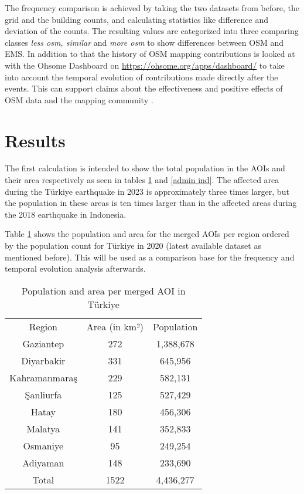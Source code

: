 \documentclass[oneside,twocolumn,10pt,cleanfoot,cleanhead]{asme2ej}
\begin{document}
The frequency comparison is achieved by taking the two datasets from before, the grid and the building counts, and calculating statistics like difference and deviation of the counts.
The resulting values are categorized into three comparing classes \textit{less osm, similar} and \textit{more osm} to show differences between OSM and EMS.
In addition to that the history of OSM mapping contributions is looked at with the Ohsome Dashboard on \url{https://ohsome.org/apps/dashboard/} to take into account the temporal evolution of contributions made directly after the events.
This can support claims about the effectiveness and positive effects of OSM data and the mapping community \cite{BarronEA2014}.


\section{Results}

The first calculation is intended to show the total population in the AOIs and their area respectively as seen in tables \ref{admin tur} and \ref{admin ind}.
The affected area during the Türkiye earthquake in 2023 is approximately three times larger, but the population in these areas is ten times larger than in the affected areas during the 2018 earthquake in Indonesia.

Table \ref{admin tur} shows the population and area for the merged AOIs per region ordered by the population count for Türkiye in 2020 (latest available dataset as mentioned before).
This will be used as a comparison base for the frequency and temporal evolution analysis afterwards.

\begin{table}
    \caption{Population and area per merged AOI in Türkiye}
    \begin{center}
        \label{admin tur}
        \begin{tabular}{c c c}
            & & \\ %
            \hline
            Region & Area (in km²) & Population \\
            \hline
            Gaziantep & 272 & 1,388,678 \\
            Diyarbakir & 331 & 645,956 \\
            Kahramanmaraş & 229 & 582,131 \\
            Şanliurfa & 125 & 527,429 \\
            Hatay & 180 & 456,306 \\
            Malatya & 141 & 352,833 \\
            Osmaniye & 95 & 249,254\\
            Adiyaman & 148 & 233,690 \\
            \hline
            Total & 1522 & 4,436,277 \\
            \hline
        \end{tabular}
    \end{center}
\end{table}
\end{document}
